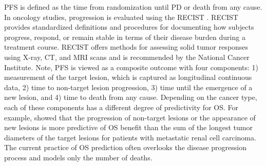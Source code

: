 \ac{PFS} is defined as the time from randomization until \ac{PD} or death from any cause. In oncology studies, progression is evaluated using the \ac{RECIST} \citep{eisenhauer2009new}. \ac{RECIST} provides standardized definitions and procedures for documenting how subjects progress, respond, or remain stable in terms of their disease burden during a treatment course. \ac{RECIST} offers methods for assessing solid tumor responses using X-ray, CT, and MRI scans and is recommended by the National Cancer Institute. Note, \ac{PFS} is viewed as a composite outcome with four components: 1) measurement of the target lesion, which is captured as longitudinal continuous data, 2) time to non-target lesion progression, 3) time until the emergence of a new lesion, and 4) time to death from any cause. Depending on the cancer type, each of these components has a different degree of predictivity for \ac{OS}. For example, \cite{stein2013survival} showed that the progression of non-target lesions or the appearance of new lesions is more predictive of \ac{OS} benefit than the sum of the longest tumor diameters of the target lesions for patients with metastatic renal cell carcinoma. The current practice of \ac{OS} prediction often overlooks the disease progression process and models only the number of deaths.

